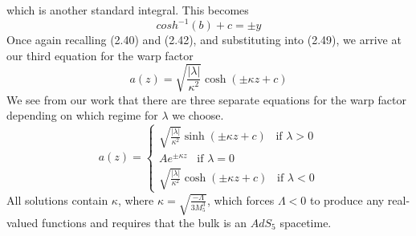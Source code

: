 \documentclass[11pt]{report}
\numberwithin{equation}{chapter}
\begin{document}
which is another standard integral. This becomes
\begin{equation}
    {cosh}^{-1}\left(b\right)+c=\pm y
\end{equation}
Once again recalling (2.40) and (2.42), and substituting into (2.49), we arrive at our third equation for the warp factor
\begin{equation}
 a\left(z\right)=\sqrt{\frac{|\lambda |}{\kappa^2}}\cosh\left(\pm\kappa z+c\right)
\end{equation}
We see from our work that there are three separate equations for the warp factor depending on which regime for $\lambda$ we choose.
\begin{equation}
    a\left(z\right)=
    \begin{cases}
        \sqrt{\frac{|\lambda |}{\kappa^2}}\sinh\left(\pm\kappa z+c\right)\hspace{10pt}\text{if } \lambda > 0\\[10pt]
        Ae^{\pm\kappa z}\hspace{10pt}\text{if } \lambda = 0\\[10pt]
        \sqrt{\frac{|\lambda |}{\kappa^2}}\cosh\left(\pm\kappa z+c\right) \hspace{10pt}\text{if } \lambda < 0
    \end{cases}
\end{equation}
All solutions contain $\kappa$, where $\kappa = \sqrt{\frac{-\Lambda}{3M^3_5}}$, which forces $\Lambda < 0$ to produce any real-valued functions and requires that the bulk is an $AdS_5$ spacetime.
\end{document}
